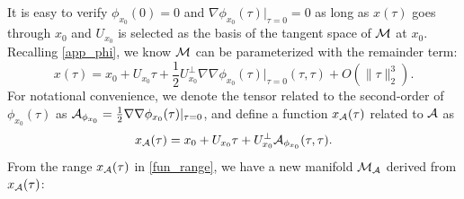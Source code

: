 \documentclass{article}
\newtheorem{theorem}{Theorem}[section]
\theoremstyle{remark}
\begin{document}
%
It is easy to verify $\phi_{x_0}(0)=0$ and $\nabla\phi_{x_0}(\tau)|_{\tau=0}=0$ as long as $x(\tau)$ goes through $x_0$ and $U_{x_0}$ is selected as the basis of the tangent space of $\cal M$ at $x_0$.
Recalling \eqref{app_phi}, we know $\cal M$ can be parameterized with the remainder term:
\[
 x(\tau)= x_0+ U_{x_0} \tau + \frac{1}{2} U_{x_0}^{\perp}{\nabla\nabla\phi_{x_0}(\tau)|_{\tau=0}}(\tau, \tau)+O(\|\tau\|_2^3).
\]
For notational convenience, we denote the tensor related to the second-order of $\phi_{x_0}(\tau)$ as ${\cal A}_{\phi_{x_0}}=\frac{1}{2} {\nabla\nabla\phi_{x_0}(\tau)|_{\tau=0}}$, and define a function $x_{\cal A}(\tau)$ related to $\cal A$ as
\begin{equation}\label{fun_range}
x_{\cal A}(\tau) = x_0+ U_{x_0} \tau + U_{x_0}^{\perp} {\cal A}_{\phi_{x_0}}(\tau, \tau).
\end{equation}
From the range $x_{\cal A}(\tau)$ in \eqref{fun_range}, we have a new manifold ${\cal M_A}$ derived from $x_{\cal A}(\tau)$:
\end{document}
